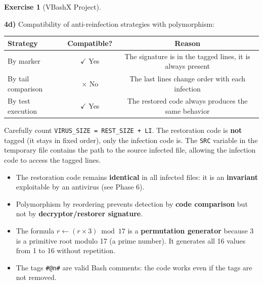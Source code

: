 \documentclass[a4paper,11pt]{article}
\theoremstyle{plain}
\theoremstyle{definition}
\newtheorem{exercice}{Exercise}
\begin{document}
\begin{exercice}[VBashX Project]
\begin{correction}
\textbf{4d)} Compatibility of anti-reinfection strategies with polymorphism:
\begin{center}
\begin{tabular}{lcc}
\toprule
\textbf{Strategy} & \textbf{Compatible?} & \textbf{Reason} \\
\midrule
By marker & $\checkmark$ Yes & The signature is in the tagged lines, it is always present \\
By tail comparison & $\times$ No & The last lines change order with each infection \\
By test execution & $\checkmark$ Yes & The restored code always produces the same behavior \\
\bottomrule
\end{tabular}
\end{center}

\begin{attention}
Carefully count \texttt{VIRUS\_SIZE = REST\_SIZE + LI}. The restoration code is \textbf{not} tagged (it stays in fixed order), only the infection code is. The \texttt{SRC} variable in the temporary file contains the path to the source infected file, allowing the infection code to access the tagged lines.
\end{attention}

\begin{pointcle}
\begin{itemize}
    \item The restoration code remains \textbf{identical} in all infected files: it is an \textbf{invariant} exploitable by an antivirus (see Phase 6).
    \item Polymorphism by reordering prevents detection by \textbf{code comparison} but not by \textbf{decryptor/restorer signature}.
    \item The formula $r \leftarrow (r \times 3) \bmod 17$ is a \textbf{permutation generator} because 3 is a primitive root modulo 17 (a prime number). It generates all 16 values from 1 to 16 without repetition.
    \item The tags \texttt{\#@n\#} are valid Bash comments: the code works even if the tags are not removed.
\end{itemize}
\end{pointcle}

\end{correction}




\end{exercice}
\end{document}
